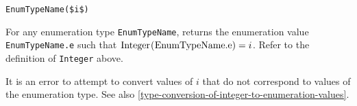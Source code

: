 \begin{operatordefinition*}[<EnumTypeName>]\label{modelica:enumeration-of-integer}
\begin{synopsis}\begin{lstlisting}
EnumTypeName($i$)
\end{lstlisting}\end{synopsis}
\begin{semantics}
For any enumeration type \lstinline!EnumTypeName!, returns the enumeration value \lstinline!EnumTypeName.e! such that $\text{\lstinline!Integer(EnumTypeName.e)!} = i$.
Refer to the definition of \lstinline!Integer! above.

It is an error to attempt to convert values of $i$ that do not correspond to values of the enumeration type.
See also \cref{type-conversion-of-integer-to-enumeration-values}.
\end{semantics}
\end{operatordefinition*}

